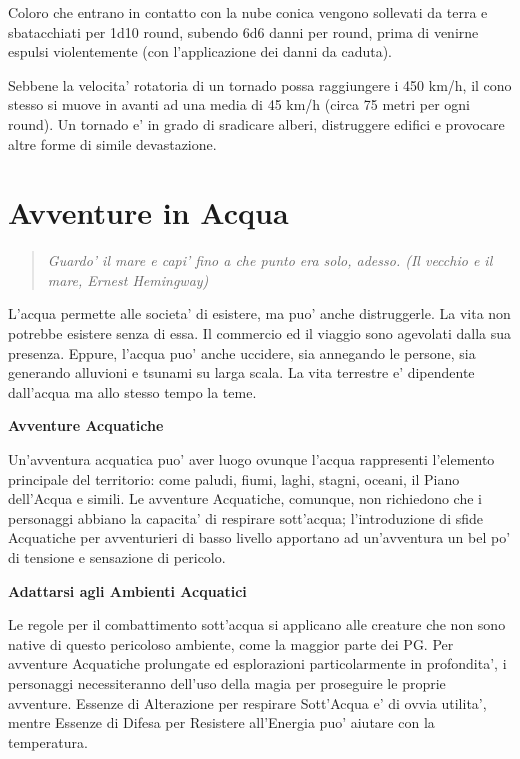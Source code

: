 \documentclass[a4paper,11pt,twoside,openany]{book}
\begin{document}
{		Coloro che entrano in contatto con la nube conica vengono sollevati da terra e sbatacchiati per 1d10 round, subendo 6d6 danni per round, prima di venirne espulsi violentemente (con l'applicazione dei danni da caduta).
		
		Sebbene la velocita' rotatoria di un tornado possa raggiungere i 450 km/h, il cono stesso si muove in avanti ad una media di 45 km/h (circa 75 metri per ogni round). Un tornado e' in grado di sradicare alberi, distruggere edifici e provocare altre forme di simile devastazione.
		
		\pagebreak
		
		\section{Avventure in Acqua}
		
		\label{avventure-in-acqua}
		\begin{quote}\textit{
				Guardo' il mare e capi' fino a che punto era solo, adesso. (Il vecchio e il mare, Ernest Hemingway)
		}\end{quote}
		
		L'acqua permette alle societa' di esistere, ma puo' anche distruggerle. La vita non potrebbe esistere senza di essa. Il commercio ed il viaggio sono agevolati dalla sua presenza. Eppure, l'acqua puo' anche uccidere, sia annegando le persone, sia generando alluvioni e tsunami su larga scala. La vita terrestre e' dipendente dall'acqua ma allo stesso tempo la teme.
		
		\textbf{Avventure Acquatiche}
		
		Un'avventura acquatica puo' aver luogo ovunque l'acqua rappresenti l'elemento principale del territorio: come paludi, fiumi, laghi, stagni, oceani, il Piano dell'Acqua e simili. Le avventure Acquatiche, comunque, non richiedono che i personaggi abbiano la capacita' di respirare sott'acqua; l'introduzione di sfide Acquatiche per avventurieri di basso livello apportano ad un'avventura un bel po' di tensione e sensazione di pericolo.
		
		\textbf{Adattarsi agli Ambienti Acquatici}
		
		Le regole per il combattimento sott'acqua si applicano alle creature che non sono native di questo pericoloso ambiente, come la maggior parte dei PG. Per avventure Acquatiche prolungate ed esplorazioni particolarmente in profondita', i personaggi necessiteranno dell'uso della magia per proseguire le proprie avventure. Essenze di Alterazione per respirare Sott'Acqua e' di ovvia utilita', mentre Essenze di Difesa per Resistere all'Energia puo' aiutare con la temperatura.
		
}
\end{document}
